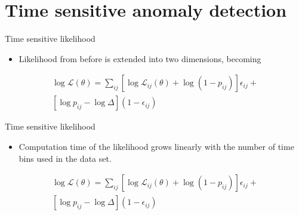 \documentclass{beamer}
\begin{document}
    \section{Time sensitive anomaly detection}

    \begin{frame}{Time sensitive likelihood}
        \begin{itemize}
        \item Likelihood from before is extended into two dimensions, becoming
        \end{itemize}
        \begin{multline}\label{eq:time_sep_flagged}
        \log \mathcal{L} \left(\theta\right) = \sum_{ij} \left[\log \mathcal{L}_{ij} \left(\theta\right) + \log\left(1-p_{ij}\right)\right]\epsilon_{ij} +
        \\
        \left[ \log p_{ij} - \log \Delta \right]\left(1-\epsilon_{ij}\right)
        \end{multline}
      \end{frame}


    \begin{frame}{Time sensitive likelihood}
        \begin{itemize}
        \item Computation time of the likelihood grows linearly with the number of time bins used in the data set.
        \end{itemize}
        \begin{multline}\label{eq:time_sep_flagged}
        \log \mathcal{L} \left(\theta\right) = \sum_{ij} \left[\log \mathcal{L}_{ij} \left(\theta\right) + \log\left(1-p_{ij}\right)\right]\epsilon_{ij} +
        \\
        \left[ \log p_{ij} - \log \Delta \right]\left(1-\epsilon_{ij}\right)
        \end{multline}
      \end{frame}
\end{document}
